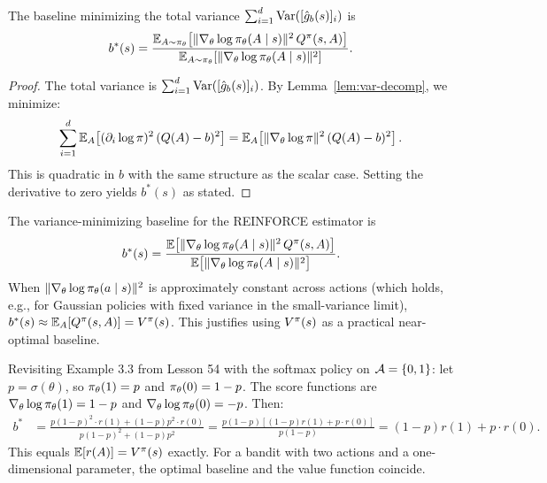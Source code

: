 \documentclass[11pt,a4paper]{article}
\begin{document}
\begin{theorem}
\label{thm:optimal-baseline-total}
The baseline minimizing the total variance
$\sum_{i=1}^{d} \operatorname{Var}([\hat{g}_b(s)]_i)$ is
\[
  b^*(s)
  = \frac{\mathbb{E}_{A \sim \pi_\theta}\!\left[
    \|\nabla_\theta \log \pi_\theta(A \mid s)\|^2\, Q^{\pi}(s,A)\right]}
    {\mathbb{E}_{A \sim \pi_\theta}\!\left[
    \|\nabla_\theta \log \pi_\theta(A \mid s)\|^2\right]}.
\]
\end{theorem}

\begin{proof}
The total variance is $\sum_{i=1}^d \operatorname{Var}([\hat{g}_b(s)]_i)$. By
Lemma~\ref{lem:var-decomp}, we minimize:
\[
  \sum_{i=1}^d \mathbb{E}_A\!\left[(\partial_i \log \pi)^2\,
  (Q(A) - b)^2\right]
  = \mathbb{E}_A\!\left[\|\nabla_\theta \log \pi\|^2\, (Q(A) - b)^2\right].
\]
This is quadratic in $b$ with the same structure as the scalar case.
Setting the derivative to zero yields $b^*(s)$ as stated.
\end{proof}

\begin{keyresult}[title={Optimal Baseline}]
The variance-minimizing baseline for the REINFORCE estimator is
\[
  b^*(s) = \frac{\mathbb{E}\bigl[\|\nabla_\theta \log \pi_\theta(A \mid s)\|^2
    \, Q^{\pi}(s,A)\bigr]}
    {\mathbb{E}\bigl[\|\nabla_\theta \log \pi_\theta(A \mid s)\|^2\bigr]}.
\]
When $\|\nabla_\theta \log \pi_\theta(a \mid s)\|^2$ is approximately
constant across actions (which holds, e.g., for Gaussian policies with
fixed variance in the small-variance limit), $b^*(s) \approx
\mathbb{E}_A[Q^{\pi}(s,A)] = V^{\pi}(s)$. This justifies using $V^{\pi}(s)$ as a
practical near-optimal baseline.
\end{keyresult}

\begin{example}
\label{ex:optimal-baseline-bandit}
Revisiting Example 3.3 from Lesson 54 with the softmax policy on
$\mathcal{A} = \{0,1\}$: let $p = \sigma(\theta)$, so
$\pi_\theta(1) = p$ and $\pi_\theta(0) = 1-p$. The score
functions are $\nabla_\theta \log \pi_\theta(1) = 1-p$ and
$\nabla_\theta \log \pi_\theta(0) = -p$. Then:
\begin{align*}
  b^*
  &= \frac{p(1-p)^2 \cdot r(1) + (1-p)p^2 \cdot r(0)}
          {p(1-p)^2 + (1-p)p^2}
  = \frac{p(1-p)[(1-p)r(1) + p \cdot r(0)]}{p(1-p)}
  = (1-p)r(1) + p\cdot r(0).
\end{align*}
This equals $\mathbb{E}[r(A)] = V^{\pi}(s)$ exactly. For a bandit with two actions
and a one-dimensional parameter, the optimal baseline and the value
function coincide.
\end{example}
\end{document}

